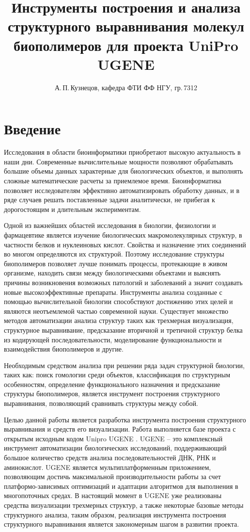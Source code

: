 \documentclass[a4paper, 12pt, titlepage, utf8]{extarticle}
\author{А.\,П.\,Кузнецов, кафедра ФТИ ФФ НГУ, гр.\,7312}
\title{Инструменты построения и анализа структурного выравнивания молекул биополимеров для проекта UniPro UGENE}
\let\oldsection\section         %
\renewcommand{\section}{\newpage\oldsection}
\begin{document}


\tableofcontents
\newpage

\section{Введение}	%
Исследования в области биоинформатики приобретают высокую актуальность в наши дни. Современные вычислительные мощности позволяют обрабатывать большие объемы данных характерные для биологических объектов, и выполнять сложные математические расчеты за приемлемое время. Биоинформатика позволяет исследователям эффективно автоматизировать обработку данных, и в ряде случаев решать поставленные задачи аналитически, не прибегая к дорогостоящим и длительным экспериментам.

Одной из важнейших областей исследования в биологии, физиологии и фармацевтике является изучение биологических макромолекулярных структур, в частности белков и нуклеиновых кислот. Свойства и назначение этих соединений во многом определяются их структурой. Поэтому исследование структуры биополимеров позволяет лучше понимать процессы, протекающие в живом организме, находить связи между биологическими объектами и выяснять причины возникновения возможных патологий и заболеваний а значит создавать новые высокоэффективные препараты. Инструменты анализа созданные с помощью вычислительной биологии способствуют достижению этих целей и являются неотъемлемой частью современной науки. Существует множество методов автоматизации анализа структур таких как трехмерная визуализация,  структурное выравнивание, предсказание вторичной и третичной структур белка из кодирующей последовательности, моделирование функциональности и взаимодействия биополимеров и другие.

Необходимым средством анализа при решении ряда задач структурной биологии, таких как: поиск гомологии среди объектов, классификация по структурным особенностям, определение функционального назначения и предсказание структуры биополимеров, является инструмент построения структурного выравнивания, позволяющий сравнивать структуры между собой.

Целью данной работы является разработка инструмента построения структурного выравнивания и средств его визуализации. Работа выполняется базе проекта с открытым исходным кодом Unipro UGENE \cite{ugene}. UGENE -- это комплексный инструмент автоматизации биологических исследований, поддерживающий большое количество средств анализа последовательностей ДНК, РНК и аминокислот. UGENE является мультиплатформенным приложением, позволяющим достичь максимальной производительности работы за счет платформо-зависимых оптимизаций и адаптации алгоритмов для выполнения в многопоточных средах. В настоящий момент в UGENE уже реализованы средства визуализации трехмерных структур, а также некоторые базовые методы структурного анализа, таким образом, реализация инструмента построения структурного выравнивания является закономерным шагом в развитии проекта.
\end{document}
